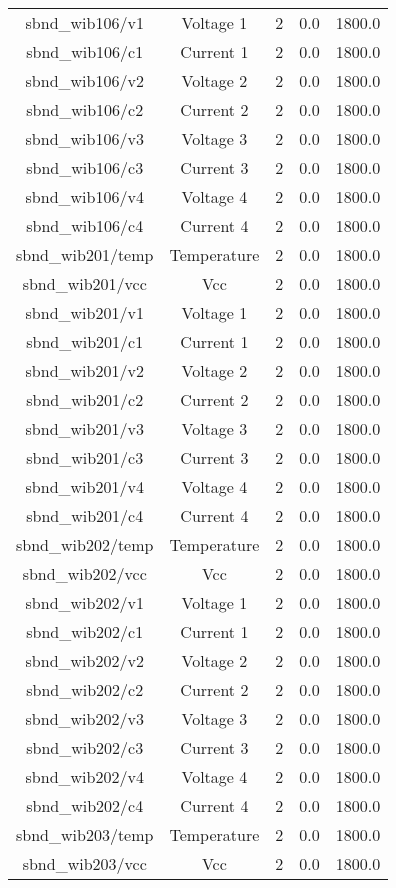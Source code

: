\begin{table}[ptb]
\begin{tabular}{c | c c c c}
sbnd_wib106/v1 & Voltage 1 & 2 & 0.0 & 1800.0\\ 
sbnd_wib106/c1 & Current 1 & 2 & 0.0 & 1800.0\\ 
sbnd_wib106/v2 & Voltage 2 & 2 & 0.0 & 1800.0\\ 
sbnd_wib106/c2 & Current 2 & 2 & 0.0 & 1800.0\\ 
sbnd_wib106/v3 & Voltage 3 & 2 & 0.0 & 1800.0\\ 
sbnd_wib106/c3 & Current 3 & 2 & 0.0 & 1800.0\\ 
sbnd_wib106/v4 & Voltage 4 & 2 & 0.0 & 1800.0\\ 
sbnd_wib106/c4 & Current 4 & 2 & 0.0 & 1800.0\\ 
sbnd_wib201/temp & Temperature & 2 & 0.0 & 1800.0\\ 
sbnd_wib201/vcc & Vcc & 2 & 0.0 & 1800.0\\ 
sbnd_wib201/v1 & Voltage 1 & 2 & 0.0 & 1800.0\\ 
sbnd_wib201/c1 & Current 1 & 2 & 0.0 & 1800.0\\ 
sbnd_wib201/v2 & Voltage 2 & 2 & 0.0 & 1800.0\\ 
sbnd_wib201/c2 & Current 2 & 2 & 0.0 & 1800.0\\ 
sbnd_wib201/v3 & Voltage 3 & 2 & 0.0 & 1800.0\\ 
sbnd_wib201/c3 & Current 3 & 2 & 0.0 & 1800.0\\ 
sbnd_wib201/v4 & Voltage 4 & 2 & 0.0 & 1800.0\\ 
sbnd_wib201/c4 & Current 4 & 2 & 0.0 & 1800.0\\ 
sbnd_wib202/temp & Temperature & 2 & 0.0 & 1800.0\\ 
sbnd_wib202/vcc & Vcc & 2 & 0.0 & 1800.0\\ 
sbnd_wib202/v1 & Voltage 1 & 2 & 0.0 & 1800.0\\ 
sbnd_wib202/c1 & Current 1 & 2 & 0.0 & 1800.0\\ 
sbnd_wib202/v2 & Voltage 2 & 2 & 0.0 & 1800.0\\ 
sbnd_wib202/c2 & Current 2 & 2 & 0.0 & 1800.0\\ 
sbnd_wib202/v3 & Voltage 3 & 2 & 0.0 & 1800.0\\ 
sbnd_wib202/c3 & Current 3 & 2 & 0.0 & 1800.0\\ 
sbnd_wib202/v4 & Voltage 4 & 2 & 0.0 & 1800.0\\ 
sbnd_wib202/c4 & Current 4 & 2 & 0.0 & 1800.0\\ 
sbnd_wib203/temp & Temperature & 2 & 0.0 & 1800.0\\ 
sbnd_wib203/vcc & Vcc & 2 & 0.0 & 1800.0\\ 

\end{tabular}
\end{table}
